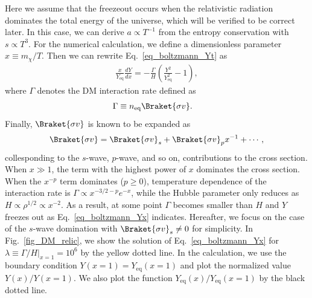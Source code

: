 \documentclass[12pt,twoside,book]{article}
\begin{document}
Here we assume that the freezeout occurs when the relativistic radiation
dominates the total energy of the universe, which will be verified to be
correct later.  In this case, we can derive $a \propto T^{-1}$ from the
entropy conservation with $s \propto T^3$.  For the numerical
calculation, we define a dimensionless parameter $x \equiv m_\chi / T$.
Then we can rewrite Eq.~\eqref{eq_boltzmann_Yt} as
\begin{align}
 \frac{x}{Y_{\mathrm{eq}}} \frac{d Y}{d x} =
 -\frac{\Gamma}{H} \left( \frac{Y^2}{Y_{\mathrm{eq}}^2} - 1 \right),\label{eq_boltzmann_Yx}
\end{align}
where $\Gamma$ denotes the DM interaction rate defined as
\begin{align}
 \Gamma &\equiv n_{\mathrm{eq}} \Braket{\sigma v}.\label{eq_lambda}
\end{align}
Finally, $\Braket{\sigma v}$ is known to be expanded
as~\cite{Gondolo:1990dk}
\begin{align}
 \Braket{\sigma v} = \Braket{\sigma v}_s +
 \Braket{\sigma v}_p x^{-1} + \cdots,
\end{align}
collesponding to the $s$-wave, $p$-wave, and so on, contributions to
the cross section.  When $x \gg 1$, the term with the highest power of
$x$ dominates the cross section.  When the $x^{-p}$ term dominates ($p
\geq 0$), temperature dependence of the interaction rate is $\Gamma
\propto x^{-3/2-p} e^{-x}$, while the Hubble parameter only reduces as
$H \propto \rho^{1/2} \propto x^{-2}$.  As a result, at some point
$\Gamma$ becomes smaller than $H$ and $Y$ freezes out as
Eq.~\eqref{eq_boltzmann_Yx} indicates.  Hereafter, we focus on the
case of the $s$-wave domination with $\Braket{\sigma v}_s \neq 0$ for
simplicity.    In
Fig.~\ref{fig_DM_relic}, we show the solution of
Eq.~\eqref{eq_boltzmann_Yx} for $\lambda \equiv \left. \Gamma / H
\right|_{x=1} = 10^6$ by the yellow dotted line.  In the calculation,
we use the boundary condition $Y(x=1) = Y_{\mathrm{eq}} (x=1)$ and
plot the normalized value $Y(x) / Y(x=1)$.  We also plot the function
$Y_{\mathrm{eq}} (x) / Y_{\mathrm{eq}} (x=1)$ by the black dotted line.
\end{document}
